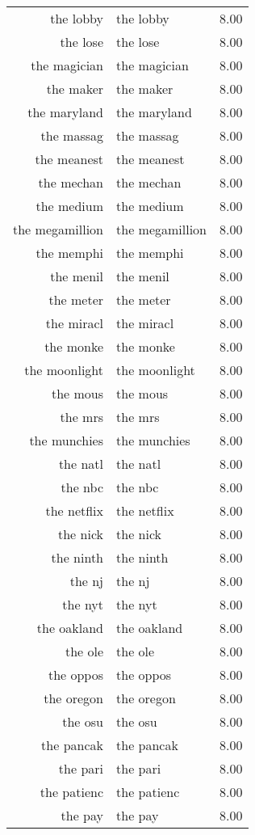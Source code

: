 \begin{table}[ht]
\begin{tabular}{rlr}
  the lobby & the lobby & 8.00 \\ 
  the lose & the lose & 8.00 \\ 
  the magician & the magician & 8.00 \\ 
  the maker & the maker & 8.00 \\ 
  the maryland & the maryland & 8.00 \\ 
  the massag & the massag & 8.00 \\ 
  the meanest & the meanest & 8.00 \\ 
  the mechan & the mechan & 8.00 \\ 
  the medium & the medium & 8.00 \\ 
  the megamillion & the megamillion & 8.00 \\ 
  the memphi & the memphi & 8.00 \\ 
  the menil & the menil & 8.00 \\ 
  the meter & the meter & 8.00 \\ 
  the miracl & the miracl & 8.00 \\ 
  the monke & the monke & 8.00 \\ 
  the moonlight & the moonlight & 8.00 \\ 
  the mous & the mous & 8.00 \\ 
  the mrs & the mrs & 8.00 \\ 
  the munchies & the munchies & 8.00 \\ 
  the natl & the natl & 8.00 \\ 
  the nbc & the nbc & 8.00 \\ 
  the netflix & the netflix & 8.00 \\ 
  the nick & the nick & 8.00 \\ 
  the ninth & the ninth & 8.00 \\ 
  the nj & the nj & 8.00 \\ 
  the nyt & the nyt & 8.00 \\ 
  the oakland & the oakland & 8.00 \\ 
  the ole & the ole & 8.00 \\ 
  the oppos & the oppos & 8.00 \\ 
  the oregon & the oregon & 8.00 \\ 
  the osu & the osu & 8.00 \\ 
  the pancak & the pancak & 8.00 \\ 
  the pari & the pari & 8.00 \\ 
  the patienc & the patienc & 8.00 \\ 
  the pay & the pay & 8.00 \\ 

\end{tabular}
\end{table}
